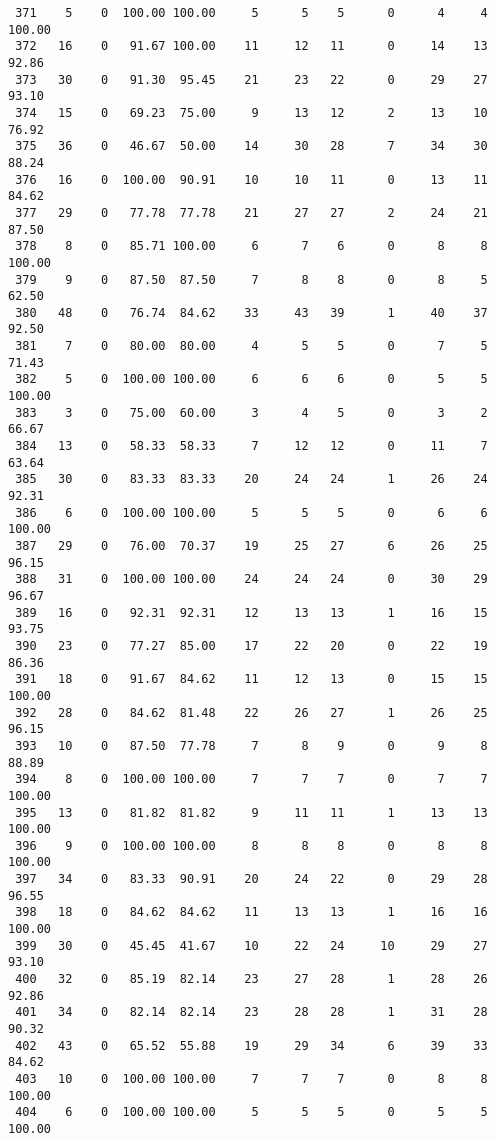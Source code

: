 \begin{verbatim}
 371    5    0  100.00 100.00     5      5    5      0      4     4   100.00
 372   16    0   91.67 100.00    11     12   11      0     14    13    92.86
 373   30    0   91.30  95.45    21     23   22      0     29    27    93.10
 374   15    0   69.23  75.00     9     13   12      2     13    10    76.92
 375   36    0   46.67  50.00    14     30   28      7     34    30    88.24
 376   16    0  100.00  90.91    10     10   11      0     13    11    84.62
 377   29    0   77.78  77.78    21     27   27      2     24    21    87.50
 378    8    0   85.71 100.00     6      7    6      0      8     8   100.00
 379    9    0   87.50  87.50     7      8    8      0      8     5    62.50
 380   48    0   76.74  84.62    33     43   39      1     40    37    92.50
 381    7    0   80.00  80.00     4      5    5      0      7     5    71.43
 382    5    0  100.00 100.00     6      6    6      0      5     5   100.00
 383    3    0   75.00  60.00     3      4    5      0      3     2    66.67
 384   13    0   58.33  58.33     7     12   12      0     11     7    63.64
 385   30    0   83.33  83.33    20     24   24      1     26    24    92.31
 386    6    0  100.00 100.00     5      5    5      0      6     6   100.00
 387   29    0   76.00  70.37    19     25   27      6     26    25    96.15
 388   31    0  100.00 100.00    24     24   24      0     30    29    96.67
 389   16    0   92.31  92.31    12     13   13      1     16    15    93.75
 390   23    0   77.27  85.00    17     22   20      0     22    19    86.36
 391   18    0   91.67  84.62    11     12   13      0     15    15   100.00
 392   28    0   84.62  81.48    22     26   27      1     26    25    96.15
 393   10    0   87.50  77.78     7      8    9      0      9     8    88.89
 394    8    0  100.00 100.00     7      7    7      0      7     7   100.00
 395   13    0   81.82  81.82     9     11   11      1     13    13   100.00
 396    9    0  100.00 100.00     8      8    8      0      8     8   100.00
 397   34    0   83.33  90.91    20     24   22      0     29    28    96.55
 398   18    0   84.62  84.62    11     13   13      1     16    16   100.00
 399   30    0   45.45  41.67    10     22   24     10     29    27    93.10
 400   32    0   85.19  82.14    23     27   28      1     28    26    92.86
 401   34    0   82.14  82.14    23     28   28      1     31    28    90.32
 402   43    0   65.52  55.88    19     29   34      6     39    33    84.62
 403   10    0  100.00 100.00     7      7    7      0      8     8   100.00
 404    6    0  100.00 100.00     5      5    5      0      5     5   100.00

\end{verbatim}

